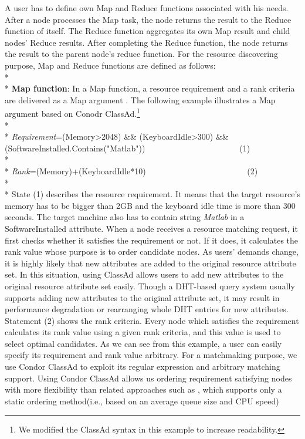 \documentclass{acm_proc_article-sp}
\begin{document}
A user has to define own Map and Reduce functions associated with his needs. 
After a node processes the Map task, the node returns the result to the Reduce function of itself.
The Reduce function aggregates its own Map result and child nodes' Reduce results. 
After completing the Reduce function, the node returns the result to the parent node's reduce function.
For the resource discovering purpose, Map and Reduce functions are defined as follows:\\*\\*
\textbf{Map function}: In a Map function, a resource requirement and a rank criteria are delivered as a Map argument .
The following example illustrates a Map argument based on Conodr ClassAd.\footnote{We modified the ClassAd syntax in this example to increase readability.}\\*\\*
\textit{Requirement}=(Memory>2048) \&\& (KeyboardIdle>300) \&\& (SoftwareInstalled.Contains("Matlab"))\ \ \ \ \ \ \ \ \ \ \ \ \ \ \ \ \ \ \ \ \ \ \ (1)\\*\\*
\textit{Rank}=(Memory)+(KeyboardIdle*10) \ \ \ \ \ \ \ \ \ \ \ \ \ \ \ \ \ \ \ \ \ \ \ \ (2)\\*\\*
State (1) describes the resource requirement. It means that the target resource's memory has to be bigger than 2GB and the keyboard idle time is more than 300 seconds.
The target machine also has to contain string \textit{Matlab} in a SoftwareInstalled attribute.
When a node receives a resource matching request, it first checks whether it satisfies the requirement or not. If it does, it calculates the rank value whose purpose is to order candidate nodes.
As users' demands change, it is highly likely that new attributes are added to the original resource attribute set. 
In this situation, using ClassAd allows users to add new attributes to the original resource attribute set easily.
Though a DHT-based query system usually supports adding new attributes to the original attribute set, it may result in performance degradation or rearranging whole DHT entries for new attributes.
Statement (2) shows the rank criteria. Every node which satisfies the requirement calculates its rank value using a given rank criteria, and this value is used to select optimal candidates.
As we can see from this example, a user can easily specify its requirement and rank value arbitrary.
For a matchmaking purpose, we use Condor ClassAd\cite{classad} to exploit its regular expression and arbitrary matching support.
Using Condor ClassAd allows us ordering requirement satisfying nodes with more flexibility than related approaches such as \cite{can_query}, which supports only a static ordering method(i.e., based on an average queue size and CPU speed)
\end{document}

